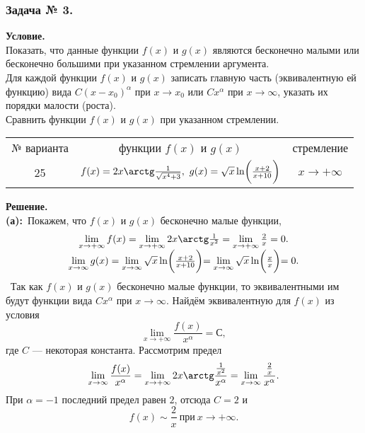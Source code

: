\documentclass{article}
\begin{document}
\begin{flushleft}
\subsubsection*{\center Задача № 3.}
{\bf Условие.~}\\
 Показать, что данные функции
$f(x)$ и $g(x)$ являются бесконечно малыми или бесконечно большими
при указанном стремлении аргумента. \\
 Для каждой функции $f(x)$ и $g(x)$ записать главную часть
(эквивалентную ей функцию)  вида $C(x-x_0)^{\alpha}$ при $x\rightarrow x_0$ или $Cx^{\alpha}$
при $x\rightarrow\infty$, указать их порядки малости (роста). \\
 Сравнить функции $f(x)$ и $g(x)$ при указанном стремлении.
\begin{center}
	\begin{tabular}{|c|c|c|}
		\hline
		№ варианта & функции $f(x)$ и $g(x)$ & стремление \\[6pt]
		25 & $f(x) = 2x\arctg\frac{1}{\sqrt{x^4+3}},~g(x)=\sqrt{x}\ln\biggl(\frac{x+2}{x+10}\biggl)$ & $x\rightarrow+\infty$ \\
		\hline
	\end{tabular}
\end{center}
{\bf Решение.~}\\
\textbf{(а):}~Покажем, что $f(x)$ и $g(x)$ бесконечно малые функции,
$$
\begin{array}{cc}
\lim\limits_{x\rightarrow+\infty}f(x) =  \lim\limits_{x\rightarrow+\infty}2x\arctg\frac{1}{x^2} =
\lim\limits_{x\rightarrow+\infty}\frac{2}{x} = 0.\\
\lim\limits_{x\rightarrow\infty}g(x) = \lim\limits_{x\rightarrow\infty}\sqrt{x}\ln\biggl(\frac{x+2}{x+10}\biggl) = 
\lim\limits_{x\rightarrow\infty}\sqrt{x}\ln\biggl(\frac{x}{x}\biggl) = 0.
\end{array}
$$	
~Так как $f(x)$ и $g(x)$ бесконечно малые функции, то эквивалентными им будут функции вида 
$Cx^{\alpha}$ при $x\rightarrow\infty$. Найдём эквивалентную для $f(x)$ из условия
$$
\lim\limits_{x\rightarrow+\infty}\dfrac{f(x)}{x^{\alpha}} = С,
$$
где $C$ --- некоторая константа. Рассмотрим предел
$$
\lim\limits_{x\rightarrow\infty}\dfrac{f(x)}{x^{\alpha}} = \lim\limits_{x\rightarrow+\infty}2x\arctg\frac{\frac{1}{x^2}}{x^\alpha} = 
\lim\limits_{x\rightarrow\infty}\frac{\frac{2}{x}}{x^\alpha}.
$$
При $\alpha=-1$ последний предел равен $2$, отсюда $C=2$ и 
$$
f(x)\sim \frac{2}{x}~\text{при}~x\rightarrow+\infty.
$$
\end{flushleft}
\end{document}
